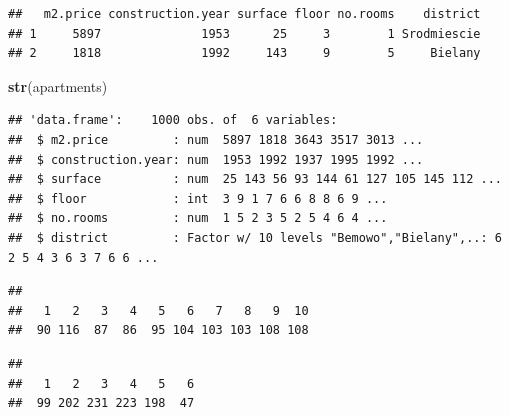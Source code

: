\documentclass[12pt,]{krantz}
\newenvironment{Shaded}{\begin{snugshade}}{\end{snugshade}}
\newcommand{\KeywordTok}[1]{\textcolor[rgb]{0.13,0.29,0.53}{\textbf{#1}}}
\newcommand{\NormalTok}[1]{#1}
\newcommand{\OperatorTok}[1]{\textcolor[rgb]{0.81,0.36,0.00}{\textbf{#1}}}
\theoremstyle{definition}
\theoremstyle{definition}
\theoremstyle{definition}
\theoremstyle{remark}
\begin{document}
\begin{verbatim}
##   m2.price construction.year surface floor no.rooms    district
## 1     5897              1953      25     3        1 Srodmiescie
## 2     1818              1992     143     9        5     Bielany
\end{verbatim}

\begin{Shaded}
\begin{Highlighting}[]
\KeywordTok{str}\NormalTok{(apartments)}
\end{Highlighting}
\end{Shaded}

\begin{verbatim}
## 'data.frame':    1000 obs. of  6 variables:
##  $ m2.price         : num  5897 1818 3643 3517 3013 ...
##  $ construction.year: num  1953 1992 1937 1995 1992 ...
##  $ surface          : num  25 143 56 93 144 61 127 105 145 112 ...
##  $ floor            : int  3 9 1 7 6 6 8 8 6 9 ...
##  $ no.rooms         : num  1 5 2 3 5 2 5 4 6 4 ...
##  $ district         : Factor w/ 10 levels "Bemowo","Bielany",..: 6 2 5 4 3 6 3 7 6 6 ...
\end{verbatim}

\begin{Shaded}
\end{Shaded}

\begin{verbatim}
## 
##   1   2   3   4   5   6   7   8   9  10 
##  90 116  87  86  95 104 103 103 108 108
\end{verbatim}

\begin{Shaded}
\end{Shaded}

\begin{verbatim}
## 
##   1   2   3   4   5   6 
##  99 202 231 223 198  47
\end{verbatim}

\begin{Shaded}
\end{Shaded}
\end{document}
